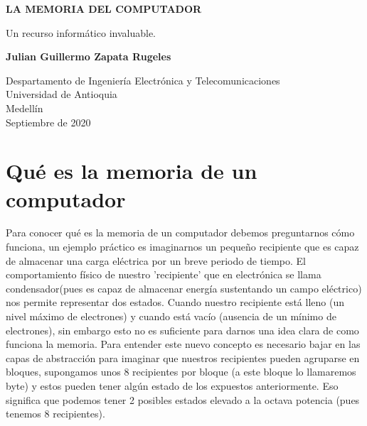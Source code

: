 \documentclass{article}
\begin{document}
\begin{titlepage}
    \begin{center}
        \vspace*{1cm}
            
        \Huge
        \textbf{LA MEMORIA DEL COMPUTADOR}
            
        \vspace{0.5cm}
        \LARGE
        Un recurso informático invaluable.
        \vspace{1.5cm}
            
        \textbf{Julian Guillermo Zapata Rugeles}
            
        \vfill
            
        \vspace{0.8cm}
            
        \Large
        Despartamento de Ingeniería Electrónica y Telecomunicaciones\\
        Universidad de Antioquia\\
        Medellín\\
        Septiembre de 2020
            
    \end{center}
\end{titlepage}

\tableofcontents

\section{Qué es la memoria de un computador}
Para conocer qué es la memoria de un computador debemos preguntarnos cómo funciona, un ejemplo práctico es imaginarnos un pequeño recipiente que es capaz de almacenar una carga eléctrica por un breve periodo de tiempo. El comportamiento físico de nuestro 'recipiente' que en electrónica se llama condensador(pues es capaz de almacenar energía sustentando un campo eléctrico) nos permite representar dos estados. Cuando nuestro recipiente está lleno (un nivel máximo de electrones) y cuando está vacío (ausencia de un mínimo de electrones), sin embargo esto no es suficiente para darnos una idea clara de como funciona la memoria.
Para entender este nuevo concepto es necesario bajar en las capas de abstracción para imaginar que nuestros recipientes pueden agruparse en bloques, supongamos unos 8 recipientes por bloque (a este bloque lo llamaremos byte) y estos pueden tener algún estado de los expuestos anteriormente. Eso significa que podemos tener 2 posibles estados elevado a la octava potencia (pues tenemos 8 recipientes).
\end{document}
